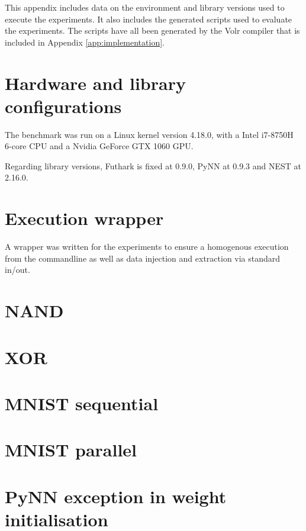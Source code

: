 
This appendix includes data on the environment and library versions used to
execute the experiments.
It also includes the generated scripts used to evaluate the experiments.
The scripts have all been generated by the Volr compiler that is included in Appendix
\ref{app:implementation}.

\section{Hardware and library configurations}
The benchmark was run on a Linux kernel version 4.18.0, with a Intel i7-8750H
6-core CPU and a Nvidia GeForce GTX 1060 GPU.

Regarding library versions, Futhark is fixed at 0.9.0, PyNN at 0.9.3 and NEST at 2.16.0.

\section{Execution wrapper}

A wrapper was written for the experiments to ensure a homogenous execution from
the commandline as well as data injection and extraction via standard in/out.



\section{NAND}


\section{XOR}

\section{MNIST sequential}

\section{MNIST parallel}

\section{PyNN exception in weight initialisation}

